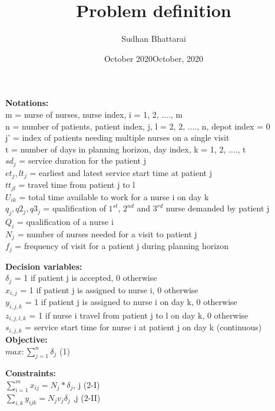 \documentclass[12pt, letterpaper]{article}
\title{\textbf{Problem definition}}
\author {Sudhan Bhattarai}
\date {October 2020}
\date{October, 2020}
\begin{document}
\maketitle
\textbf{Notations:}\\
m = nurse of nurses, nurse index, i = 1, 2, ...., m\\
n = number of patients, patient index, j, l = 2, 2, ...., n, depot index = 0\\
j' = index of patients needing multiple nurses on a single visit\\
t = number of days in planning horizon, day index, k = 1, 2, ...., t\\
$sd_j$ = service duration for the patient j\\
$et_j, lt_j$ = earliest and latest service start time at patient j\\
$tt_{jl}$ = travel time from patient j to l\\
$U_{ik}$ = total time available to work for a nurse i on day k\\
$q_j, q2_j, q3_j$ = qualification of $1^{st}$, $2^{nd}$ and $3^{rd}$ nurse demanded by patient j\\
$Q_i$ = qualification of a nurse i\\
$N_j$ = number of nurses needed for a visit to patient j\\
$f_j$ = frequency of visit for a patient j during planning horizon\\
\par
\textbf{Decision variables:}\\
\(\delta_j\) = 1 if patient j is accepted, 0 otherwise \\
\(x_{i,j}\) = 1 if patient j is assigned to nurse i, 0 otherwise  \\
\(y_{i,j,k}\) = 1 if patient j is assigned to nurse i on day k, 0 otherwise \\
\(z_{i,j,l,k}\) = 1 if nurse i travel from patient j to l on day k, 0 otherwise \\
\(s_{i,j,k}\) = service start time for nurse i at patient j on day k (continuous)\\
\clearpage
\textbf{Objective:}\\
\(max: \sum_{j=1}^n \delta_j\) \hfill (1) \\
\par
\textbf{Constraints:}\\
\(\sum_{i=1}^m x_{ij} = N_j * \delta_j\),\hspace{1cm} \forall j \hfill (2-I) \\
\(\sum_{i,k} y_{ijk} = N_j v_j  \delta_j\) \hspace{1cm} ,\forall j   \hfill (2-II)\\
\end{document}
